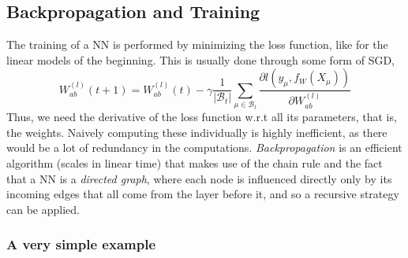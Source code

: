 \documentclass{article}
\begin{document}
\subsection{Backpropagation and Training}
The training of a NN is performed by minimizing the loss function, like for the linear models of the beginning. This is usually done through some form of SGD,
\begin{equation}
    W^{(l)}_{a b} (t+1)
    =
    W^{(l)}_{a b} (t)
    - \gamma \frac{1}{|\mathcal{B}_t|}
    \sum_{\mu \in \mathcal{B}_t}
    \frac{\partial l(y_{\mu}, f_W(X_{\mu}))}{\partial W^{(l)}_{a b}}
\end{equation}
Thus, we need the derivative of the loss function w.r.t all its parameters, that is, the weights. Naively computing these individually is highly inefficient, as there would be a lot of redundancy in the computations. \emph{Backpropagation} is an efficient algorithm (scales in linear time) that makes use of the chain rule and the fact that a NN is a \emph{directed graph}, where each node is influenced directly only by its incoming edges that all come from the layer before it, and so a recursive strategy can be applied.


\subsubsection*{A very simple example}
\end{document}
